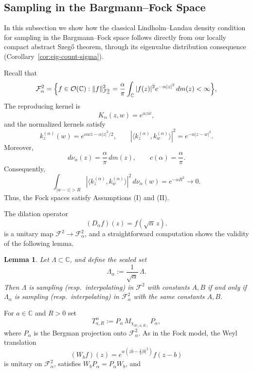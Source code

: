\documentclass{amsart}
\newtheorem{lem}[thm]{Lemma}
\theoremstyle{definition}
\theoremstyle{remark}
\numberwithin{equation}{section}
\newcommand{\C}{\mathbb{C}} %
\newcommand{\Falpha}{\mathcal{F}^{2}_{\alpha}}
\newcommand{\calF}{\mathcal{F}}
\newcommand{\Weyl}{W}
\begin{document}
\subsection{Sampling in the Bargmann--Fock Space}
\label{sec:FockSampling}

In this subsection we show how the classical Lindholm--Landau density condition \cite{lindholm2001sampling}
for sampling in the Bargmann--Fock space follows directly from
our locally compact abstract Szeg\H{o} theorem, through its eigenvalue distribution consequence (Corollary~\ref{cor:eig-count-sigma}).  

Recall that
\[
\Falpha
=\Bigl\{ f\in\mathcal{O}(\C): 
\|f\|_{\Falpha}^{2}
=\frac{\alpha}{\pi}
\int_{\C} |f(z)|^{2}e^{-\alpha|z|^{2}}\,dm(z)<\infty\Bigr\},
\]
The reproducing kernel is
\[
K_\alpha(z,w)=e^{\alpha z\overline w},
\]
and the normalized kernels satisfy
\[
k_z^{(\alpha)}(w)
=e^{\alpha w\overline z-\alpha|z|^2/2},
\qquad
\left|\langle k_z^{(\alpha)},k_w^{(\alpha)}\rangle\right|^2
=e^{-\alpha|z-w|^2}.
\]
Moreover,
\[
d\nu_\alpha(z)=\frac{\alpha}{\pi}\,dm(z),
\qquad
c(\alpha)=\frac{\alpha}{\pi}.
\]
Consequently,
\[
\int_{|w-z|>R}
\left|\langle k_z^{(\alpha)},k_w^{(\alpha)}\rangle\right|^2
\,d\nu_\alpha(w)
=e^{-\alpha R^2}\longrightarrow0.
\]
Thus, the Fock spaces satisfy Assumptions (I) and (II). 

The dilation operator
\[
(D_\alpha f)(z)=f(\sqrt{\alpha}\,z).
\]
is a unitary map $\calF^{2}\to\Falpha$, and a straightforward computation shows the validity of the following lemma.

\begin{lem}
\label{lem:scalingFock}
Let $\Lambda\subset\C$, and define the scaled set
\[
\Lambda_\alpha := \frac{1}{\sqrt{\alpha}}\,\Lambda.
\]
Then $\Lambda$ is sampling (resp.\ interpolating) in $\calF^{2}$ with constants
$A,B$ if and only if $\Lambda_\alpha$ is sampling (resp.\ interpolating) in
$\Falpha$ with the same constants $A,B$.
\end{lem}




For $a\in\C$ and $R>0$ set
\[
T^\alpha_{a,R}:=P_\alpha\,M_{\chi_{B(a,R)}}\,P_\alpha,
\] where $P_\alpha$ is the Bergman projection onto $\Falpha$. 
As in the Fock model, the Weyl translation
\[
(\Weyl_b f)(z)=e^{\alpha(z\overline{b}-\frac12|b|^{2})}f(z-b)
\]
is unitary on $\Falpha$, satisfies $\Weyl_b P_\alpha=P_\alpha\Weyl_b$, and
\end{document}
